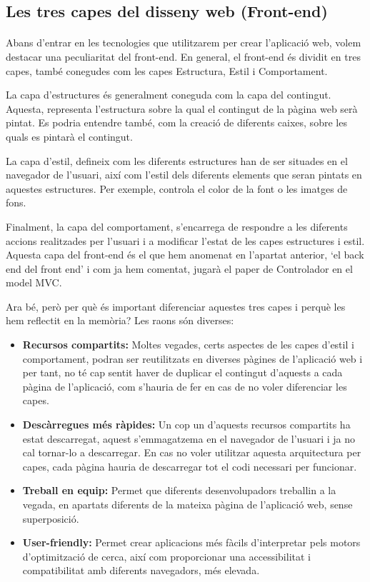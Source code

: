 \subsection{Les tres capes del disseny web (Front-end)}

    \paragraph{}
    Abans d'entrar en les tecnologies que utilitzarem per crear l’aplicació web, volem destacar una peculiaritat del front-end. En general, el front-end és dividit en tres capes, també conegudes com les capes Estructura, Estil i Comportament.

    La capa d'estructures és generalment coneguda com la capa del contingut. Aques\-ta, representa l'estructura sobre la qual el contingut de la pàgina web serà pintat. Es podria entendre també, com la creació de diferents caixes, sobre les quals es pintarà el contingut.

    La capa d'estil, defineix com les diferents estructures han de ser situades en el navegador de l’usuari, així com l'estil dels diferents elements que seran pintats en aquestes estructures. Per exemple, controla el color de la font o les imatges de fons.

    Finalment, la capa del comportament, s'encarrega de respondre a les diferents accions realitzades per l'usuari i a modificar l’estat de les capes estructures i estil. Aquesta capa del front-end és el que hem anomenat en l'apartat anterior, `el back end del front end’ i com ja hem comentat, jugarà el paper de Controlador en el model MVC.

    Ara bé, però per què és important diferenciar aquestes tres capes i perquè les hem reflectit en la memòria? Les raons són diverses:

    \begin{itemize}
        \item \textbf{Recursos compartits:} Moltes vegades, certs aspectes de les capes d'estil i comportament, podran ser reutilitzats en diverses pàgines de l’aplicació web i per tant, no té cap sentit haver de duplicar el contingut d’aquests a cada pàgina de l’aplicació, com s'hauria de fer en cas de no voler diferenciar les capes.
        \item \textbf{Descàrregues més ràpides:} Un cop un d'aquests recursos compartits ha estat descarregat, aquest s’emmagatzema en el navegador de l’usuari i ja no cal tornar-lo a descarregar. En cas no voler utilitzar aquesta arquitectura per capes, cada pàgina hauria de descarregar tot el codi necessari per funcionar.
        \item \textbf{Treball en equip:} Permet que diferents desenvolupadors treballin a la vegada, en apartats diferents de la mateixa pàgina de l'aplicació web, sense superposició.
        \item \textbf{User-friendly:} Permet crear aplicacions més fàcils d’interpretar pels motors d’optimització de cerca, així com proporcionar una accessibilitat i com\-pa\-ti\-bi\-li\-tat amb diferents navegadors, més elevada.
    \end{itemize}
